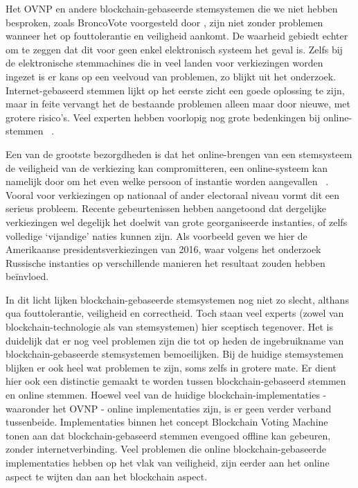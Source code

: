 	 Het OVNP en andere blockchain-gebaseerde stemsystemen die we niet hebben besproken, zoals BroncoVote voorgesteld door , zijn niet zonder problemen wanneer het op fouttolerantie en veiligheid aankomt. De waarheid gebiedt echter om te zeggen dat dit voor geen enkel elektronisch systeem het geval is. Zelfs bij de elektronische stemmachines die in veel landen voor verkiezingen worden ingezet is er kans op een veelvoud van problemen, zo blijkt uit het \textcite{Norden2015} onderzoek. Internet-gebaseerd stemmen lijkt op het eerste zicht een goede oplossing te zijn, maar in feite vervangt het de bestaande problemen alleen maar door nieuwe, met grotere risico's. Veel experten hebben voorlopig nog grote bedenkingen bij online-stemmen ~\autocite{Norden2015}. 
	 
	 Een van de grootste bezorgdheden is dat het online-brengen van een stemsysteem de veiligheid van de verkiezing kan compromitteren, een online-systeem kan namelijk door om het even welke persoon of instantie worden aangevallen ~\autocite{Norden2015}. Vooral voor verkiezingen op nationaal of ander electoraal niveau vormt dit een serieus probleem. Recente gebeurtenissen hebben aangetoond dat dergelijke verkiezingen wel degelijk het doelwit van grote georganiseerde instanties, of zelfs volledige `vijandige' naties kunnen zijn. Als voorbeeld geven we hier de Amerikaanse presidentsverkiezingen van 2016, waar volgens het \textcite{Mueller2019} onderzoek Russische instanties op verschillende manieren het resultaat zouden hebben beïnvloed.
	 
	 In dit licht lijken blockchain-gebaseerde stemsystemen nog niet zo slecht, althans qua fouttolerantie, veiligheid en correctheid. Toch staan veel experts (zowel van blockchain-technologie als van stemsystemen) hier sceptisch tegenover. Het is duidelijk dat er nog veel problemen zijn die tot op heden de ingebruikname van blockchain-gebaseerde stemsystemen bemoeilijken. Bij de huidige stemsystemen blijken er ook heel wat problemen te zijn, soms zelfs in grotere mate. Er dient hier ook een distinctie gemaakt te worden tussen blockchain-gebaseerd stemmen en online stemmen. Hoewel veel van de huidige blockchain-implementaties - waaronder het OVNP - online implementaties zijn, is er geen verder verband tussenbeide. Implementaties binnen het concept Blockchain Voting Machine tonen aan dat blockchain-gebaseerd stemmen evengoed offline kan gebeuren, zonder internetverbinding. Veel problemen die online blockchain-gebaseerde implementaties hebben op het vlak van veiligheid, zijn eerder aan  het online aspect te wijten dan aan het blockchain aspect.
	
